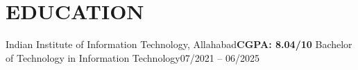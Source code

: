 % 
\vspace{-2pt}
\section{\large \textbf{EDUCATION}}
  \resumeSubHeadingListStart
    \resumeSubheading
      {Indian Institute of Information Technology, Allahabad}{\textbf{CGPA: 8.04/10}}
      {Bachelor of Technology in Information Technology}{07/2021 – 06/2025}
    \vspace{-3.5pt}
  \resumeSubHeadingListEnd
